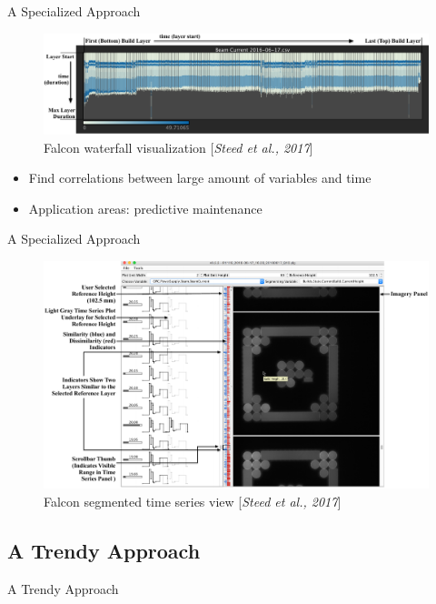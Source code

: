 \documentclass[10pt]{beamer}
\begin{document}

\begin{frame}{A Specialized Approach}
	\centering
	\begin{figure}[htbp]
		\includegraphics[scale=.22]{images/Falcon_waterfall}
		\caption{Falcon waterfall visualization [\textit{Steed et al., 2017}]}
	\end{figure}
	\begin{itemize}
		\item Find correlations between large amount of variables and time
		\item Application areas: predictive maintenance
	\end{itemize}
\end{frame}


\begin{frame}{A Specialized Approach}
	\centering
	\begin{figure}[htbp]
		\includegraphics[scale=.18]{images/Falcon_segmented}
		\caption{Falcon segmented time series view [\textit{Steed et al., 2017}]}
	\end{figure}
\end{frame}

\subsection{A Trendy Approach}
\begin{frame}{A Trendy Approach}
	\centering
	\begin{figure}[htbp]
	\end{figure}
\end{frame}
\end{document}
